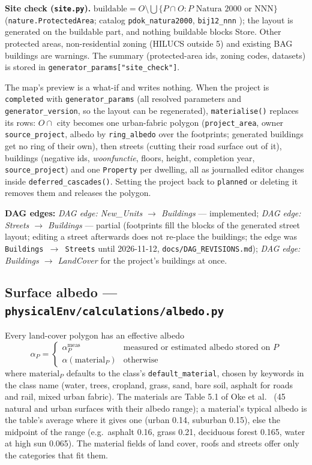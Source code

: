 \documentclass[11pt]{article}
\newcommand{\code}[1]{\texttt{#1}}
\newcommand{\dagedge}[1]{\textit{DAG edge: #1}}
\newcommand{\statusdone}{\textcolor{green!50!black}{implemented}}
\newcommand{\statuspartial}{\textcolor{orange!80!black}{partial}}
\begin{document}
\textbf{Site check (\code{site.py}).} $\text{buildable} = O \setminus \bigcup \{ P \cap O : P \text{ Natura 2000 or NNN} \}$ (\code{nature.ProtectedArea}; catalog \code{pdok\_natura2000}, \code{bij12\_nnn} \cite{BIJ12IKN}); the layout is generated on the buildable part, and nothing buildable blocks Store. Other protected areas, non-residential zoning (HILUCS outside 5) and existing BAG buildings are warnings. The summary (protected-area ids, zoning codes, datasets) is stored in \code{generator\_params["site\_check"]}.

The map's preview is a what-if and writes nothing. When the project is \code{completed} with \code{generator\_params} (all resolved parameters and \code{generator\_version}, so the layout can be regenerated), \code{materialise()} replaces its rows: $O \cap$ city becomes one urban-fabric polygon (\code{project\_area}, owner \code{source\_project}, albedo by \code{ring\_albedo} over the footprints; generated buildings get no ring of their own), then streets (cutting their road surface out of it), buildings (negative ids, \emph{woonfunctie}, floors, height, completion year, \code{source\_project}) and one \code{Property} per dwelling, all as journalled editor changes inside \code{deferred\_cascades()}. Setting the project back to \code{planned} or deleting it removes them and releases the polygon.

\textbf{DAG edges:} \dagedge{New\_Units $\rightarrow$ Buildings} --- \statusdone{}; \dagedge{Streets $\rightarrow$ Buildings} --- \statuspartial{} (footprints fill the blocks of the generated street layout; editing a street afterwards does not re-place the buildings; the edge was \code{Buildings $\rightarrow$ Streets} until 2026-11-12, \code{docs/DAG\_REVISIONS.md}); \dagedge{Buildings $\rightarrow$ LandCover} for the project's buildings at once.

\subsection{Surface albedo --- \code{physicalEnv/calculations/albedo.py}}
Every land-cover polygon has an effective albedo
\begin{equation}
  \alpha_P = \begin{cases} \alpha_P^{\text{meas}} & \text{measured or estimated albedo stored on } P \\ \alpha(\text{material}_P) & \text{otherwise} \end{cases}
\end{equation}
where $\text{material}_P$ defaults to the class's \code{default\_material}, chosen by keywords in the class name (water, trees, cropland, grass, sand, bare soil, asphalt for roads and rail, mixed urban fabric). The materials are Table 5.1 of Oke et al.\ \cite{Oke2017} (45 natural and urban surfaces with their albedo range); a material's typical albedo is the table's average where it gives one (urban 0.14, suburban 0.15), else the midpoint of the range (e.g.\ asphalt 0.16, grass 0.21, deciduous forest 0.165, water at high sun 0.065). The material fields of land cover, roofs and streets offer only the categories that fit them.
\end{document}

